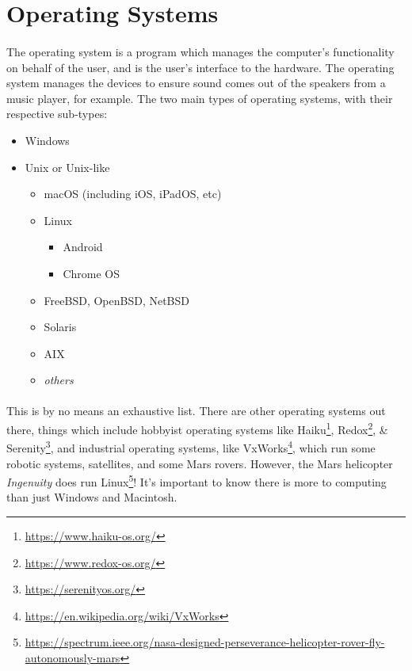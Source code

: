 \documentclass[letter,11pt]{article}
\begin{document}
\section{Operating Systems}
\paragraph{}The operating system is a program which manages the computer's functionality on behalf of the user, and is the user's interface to the hardware. The operating system manages the devices to ensure sound comes out of the speakers from a music player, for example. The two main types of operating systems, with their respective sub-types:
\begin{itemize}
    \item Windows
    \item Unix or Unix-like
    \begin{itemize}
        \item macOS (including iOS, iPadOS, etc)
        \item Linux
        \begin{itemize}
            \item Android
            \item Chrome OS
        \end{itemize}
        \item FreeBSD, OpenBSD, NetBSD
        \item Solaris
        \item AIX
        \item \textit{others}
    \end{itemize}
\end{itemize}

\paragraph{}This is by no means an exhaustive list. There are other operating systems out there, things which include hobbyist operating systems like Haiku\footnote{\url{https://www.haiku-os.org/}}, Redox\footnote{\url{https://www.redox-os.org/}}, \& Serenity\footnote{\url{https://serenityos.org/}}, and industrial operating systems, like VxWorks\footnote{\url{https://en.wikipedia.org/wiki/VxWorks}}, which run some robotic systems, satellites, and some Mars rovers. However, the Mars helicopter \textit{Ingenuity} does run Linux\footnote{\url{https://spectrum.ieee.org/nasa-designed-perseverance-helicopter-rover-fly-autonomously-mars}}! It's important to know there is more to computing than just Windows and Macintosh.
\end{document}

